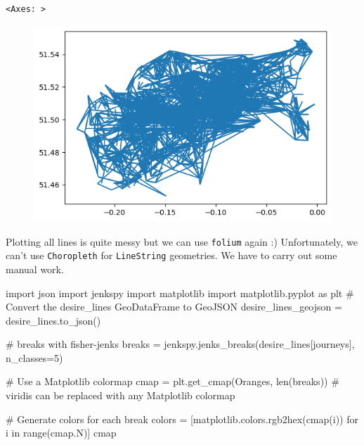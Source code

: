 \documentclass[
  letterpaper,
  DIV=11,
  numbers=noendperiod]{scrreprt}
\newenvironment{Shaded}{\begin{snugshade}}{\end{snugshade}}
\newcommand{\BuiltInTok}[1]{\textcolor[rgb]{0.00,0.23,0.31}{#1}}
\newcommand{\CommentTok}[1]{\textcolor[rgb]{0.37,0.37,0.37}{#1}}
\newcommand{\ControlFlowTok}[1]{\textcolor[rgb]{0.00,0.23,0.31}{#1}}
\newcommand{\DecValTok}[1]{\textcolor[rgb]{0.68,0.00,0.00}{#1}}
\newcommand{\ImportTok}[1]{\textcolor[rgb]{0.00,0.46,0.62}{#1}}
\newcommand{\KeywordTok}[1]{\textcolor[rgb]{0.00,0.23,0.31}{#1}}
\newcommand{\NormalTok}[1]{\textcolor[rgb]{0.00,0.23,0.31}{#1}}
\newcommand{\OperatorTok}[1]{\textcolor[rgb]{0.37,0.37,0.37}{#1}}
\newcommand{\StringTok}[1]{\textcolor[rgb]{0.13,0.47,0.30}{#1}}
\begin{document}
\begin{verbatim}
<Axes: >
\end{verbatim}

\begin{figure}[H]

{\centering \includegraphics{labs/w04_interactive_files/figure-pdf/cell-32-output-2.png}

}

\end{figure}

Plotting all lines is quite messy but we can use \texttt{folium} again
:) Unfortunately, we can't use \texttt{Choropleth} for
\texttt{LineString} geometries. We have to carry out some manual work.

\begin{Shaded}
\begin{Highlighting}[]
\ImportTok{import}\NormalTok{ json}
\ImportTok{import}\NormalTok{ jenkspy}
\ImportTok{import}\NormalTok{ matplotlib}
\ImportTok{import}\NormalTok{ matplotlib.pyplot }\ImportTok{as}\NormalTok{ plt}
\CommentTok{\# Convert the desire\_lines GeoDataFrame to GeoJSON}
\NormalTok{desire\_lines\_geojson }\OperatorTok{=}\NormalTok{ desire\_lines.to\_json()}

\CommentTok{\# breaks with fisher{-}jenks}
\NormalTok{breaks }\OperatorTok{=}\NormalTok{ jenkspy.jenks\_breaks(desire\_lines[}\StringTok{\textquotesingle{}journeys\textquotesingle{}}\NormalTok{], n\_classes}\OperatorTok{=}\DecValTok{5}\NormalTok{)}

\CommentTok{\# Use a Matplotlib colormap}
\NormalTok{cmap }\OperatorTok{=}\NormalTok{ plt.get\_cmap(}\StringTok{\textquotesingle{}Oranges\textquotesingle{}}\NormalTok{, }\BuiltInTok{len}\NormalTok{(breaks))  }\CommentTok{\# \textquotesingle{}viridis\textquotesingle{} can be replaced with any Matplotlib colormap}

\CommentTok{\# Generate colors for each break}
\NormalTok{colors }\OperatorTok{=}\NormalTok{ [matplotlib.colors.rgb2hex(cmap(i)) }\ControlFlowTok{for}\NormalTok{ i }\KeywordTok{in} \BuiltInTok{range}\NormalTok{(cmap.N)]}
\NormalTok{cmap}
\end{Highlighting}
\end{Shaded}
\end{document}
